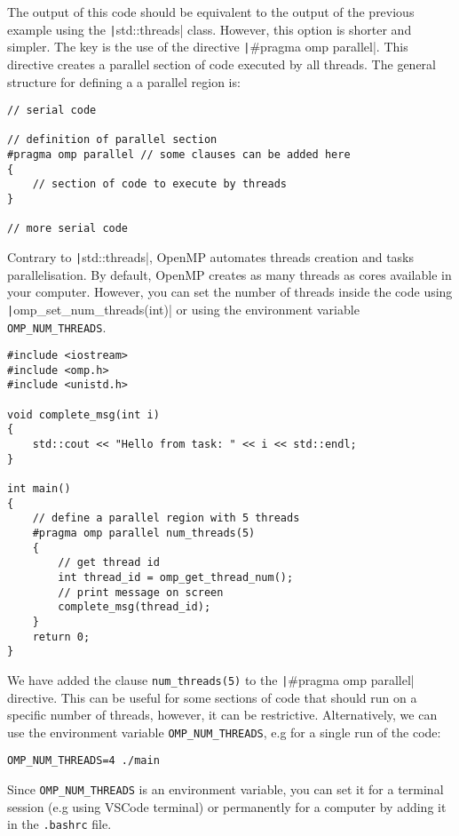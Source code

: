 \documentclass{article}
\begin{document}
The output of this code  should be equivalent to the output of the previous example using the \texttt|std::threads| class. However, this option is shorter and simpler.
The key is the use of the directive \texttt|#pragma omp parallel|. This directive creates a parallel section of code executed by all threads. The general structure for defining a a parallel region is:

\begin{verbatim}
// serial code

// definition of parallel section
#pragma omp parallel // some clauses can be added here
{
    // section of code to execute by threads
}

// more serial code
\end{verbatim}

Contrary to \texttt|std::threads|, OpenMP automates threads creation and tasks parallelisation. By default, OpenMP creates as many threads as cores available in your computer. However, you can set the number of threads inside the code using  \texttt|omp_set_num_threads(int)| or using the environment variable \verb|OMP_NUM_THREADS|.

\begin{verbatim}
#include <iostream>
#include <omp.h>
#include <unistd.h>

void complete_msg(int i)
{
    std::cout << "Hello from task: " << i << std::endl;
}

int main()
{
    // define a parallel region with 5 threads
    #pragma omp parallel num_threads(5)
    {
        // get thread id
        int thread_id = omp_get_thread_num();
        // print message on screen
        complete_msg(thread_id);
    }
    return 0;
}
\end{verbatim}

We have added the clause \verb|num_threads(5)| to the \texttt|#pragma omp parallel| directive. This can be useful for some sections of code that should run on a specific number of threads, however, it can be restrictive. Alternatively, we can use the environment variable \verb|OMP_NUM_THREADS|, e.g for a single run of the code:

\verb|OMP_NUM_THREADS=4 ./main|

Since \verb|OMP_NUM_THREADS| is an environment variable, you can set it for a terminal session (e.g using VSCode terminal) or permanently for a computer by adding it in the \verb|.bashrc| file.
\end{document}
